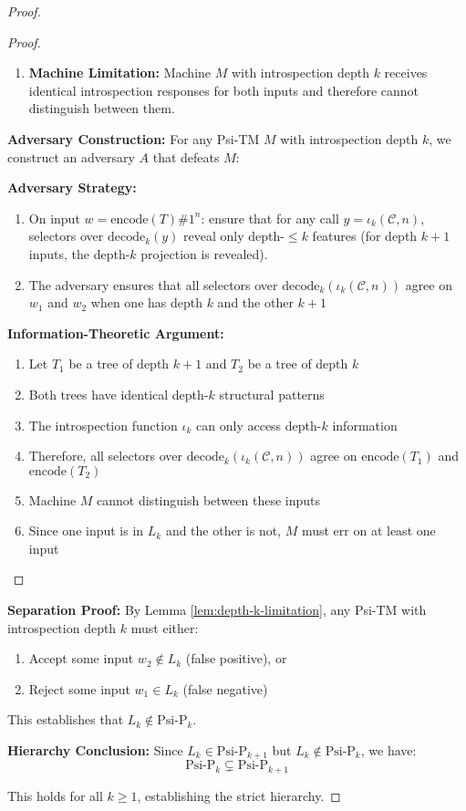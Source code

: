 \documentclass[11pt]{article}
\begin{document}
\begin{proof}
\begin{proof}
\begin{enumerate}
\item \textbf{Machine Limitation:}
  Machine $M$ with introspection depth $k$ receives identical introspection responses for both inputs and therefore cannot distinguish between them.
\end{enumerate}

\textbf{Adversary Construction:}
For any Psi-TM $M$ with introspection depth $k$, we construct an adversary $A$ that defeats $M$:

\textbf{Adversary Strategy:}
\begin{enumerate}
\item On input $w = \text{encode}(T)\#1^n$:
  ensure that for any call $y=\iota_k(\mathcal{C},n)$, selectors over $\mathrm{decode}_k(y)$ reveal only depth-$\le k$ features (for depth $k{+}1$ inputs, the depth-$k$ projection is revealed).
\item The adversary ensures that all selectors over $\mathrm{decode}_k(\iota_k(\mathcal{C},n))$ agree on $w_1$ and $w_2$ when one has depth $k$ and the other $k{+}1$
\end{enumerate}

\textbf{Information-Theoretic Argument:}
\begin{enumerate}
\item Let $T_1$ be a tree of depth $k+1$ and $T_2$ be a tree of depth $k$
\item Both trees have identical depth-$k$ structural patterns
\item The introspection function $\iota_k$ can only access depth-$k$ information
\item Therefore, all selectors over $\mathrm{decode}_k(\iota_k(\mathcal{C},n))$ agree on $\text{encode}(T_1)$ and $\text{encode}(T_2)$
\item Machine $M$ cannot distinguish between these inputs
\item Since one input is in $L_k$ and the other is not, $M$ must err on at least one input
\end{enumerate}
\end{proof}

\textbf{Separation Proof:}
By Lemma \ref{lem:depth-k-limitation}, any Psi-TM with introspection depth $k$ must either:
\begin{enumerate}
\item Accept some input $w_2 \notin L_k$ (false positive), or
\item Reject some input $w_1 \in L_k$ (false negative)
\end{enumerate}

This establishes that $L_k \notin \text{Psi-P}_k$.

\textbf{Hierarchy Conclusion:}
Since $L_k \in \text{Psi-P}_{k+1}$ but $L_k \notin \text{Psi-P}_k$, we have:
$$\text{Psi-P}_k \subsetneq \text{Psi-P}_{k+1}$$

This holds for all $k \geq 1$, establishing the strict hierarchy.
\end{proof}
\end{document}
